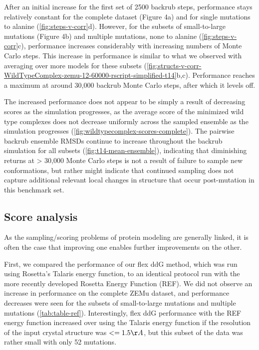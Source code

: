 After an initial increase for the first set of 2500 backrub steps, performance stays relatively constant for the complete dataset (Figure 4a) and for single mutations to alanine (\cref{fig:steps-v-corr}d). However, for the subsets of small-to-large mutations (Figure 4b) and multiple mutations, none to alanine (\cref{fig:steps-v-corr}c), performance increases considerably with increasing numbers of Monte Carlo steps. This increase in performance is similar to what we observed with averaging over more models for these subsets (\cref{fig:structs-v-corr-WildTypeComplex-zemu-12-60000-rscript-simplified-t14}b,c).
Performance reaches a maximum at around 30,000 backrub Monte Carlo steps, after which it levels off.

The increased performance does not appear to be simply a result of decreasing scores as the simulation progresses, as the average score of the minimized wild type complexes does not decrease uniformly across the sampled ensemble as the simulation progresses (\cref{fig:wildtypecomplex-scores-complete}).
The pairwise backrub ensemble RMSDs continue to increase throughout the backrub simulation for all subsets (\cref{fig:t14-mean-ensemble}), indicating that diminishing returns at > 30,000 Monte Carlo steps is not a result of failure to sample new conformations, but rather might indicate that continued sampling does not capture additional relevant local changes in structure that occur post-mutation in this benchmark set.

\subsection{Score analysis}

As the sampling/scoring problems of protein modeling are generally linked, it is often the case that improving one enables further improvements on the other.

First, we compared the performance of our flex ddG method, which was run using Rosetta's Talaris\cite{song_structure-guided_2011,shapovalov_smoothed_2011,omeara_combined_2015} energy function, to an identical protocol run with the more recently developed Rosetta Energy Function (REF)\cite{alford_rosetta_2017}. We did not observe an increase in performance on the complete ZEMu dataset, and performance decreases were seen for the subsets of small-to-large mutations and multiple mutations (\cref{tab:table-ref}). Interestingly, flex ddG performance with the REF energy function increased over using the Talaris energy function if the resolution of the input crystal structure was $<= 1.5 \AA$, but this subset of the data was rather small with only 52 mutations.

